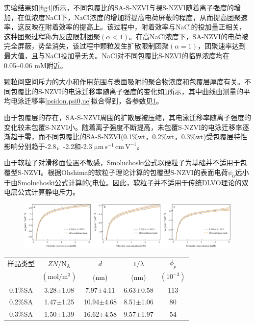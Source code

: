实验结果如\cref{fig4}所示，不同包覆比的SA-S-NZVI与裸S-NZVI随着离子强度的增加，在低浓度NaCl下，NaCl浓度的增加将提高电荷屏蔽的程度，从而提高团聚速率，这反映在附着效率的提高上。该过程中，附着效率与NaCl的投加量正相关，这种团聚过程称为反应限制团聚$(\alpha<1)$。在高NaCl浓度下，SA-NZVI的电荷被完全屏蔽，势垒消失，该过程中颗粒发生扩散限制团聚$(\alpha=1)$，团聚速率达到最大值，且与NaCl投加量无关。NaCl对不同包覆比S-NZVI的临界浓度均在0.05\textasciitilde0.06 mM附近。


颗粒间空间斥力的大小和作用范围与表面吸附的聚合物浓度和包覆层厚度有关。不同包覆比的S-NZVI的电泳迁移率随离子强度的变化如\cref{fig5}所示，其中曲线由测量的平均电泳迁移率\cref{psidon,psi0,ue}拟合得到，各参数见\cref{tb1}。

由于包覆层的存在，SA-S-NZVI周围的扩散层被压缩，其电泳迁移率随离子强度的变化较未包覆S-NZVI小。随着离子强度不断提高，未包覆S-NZVI的电泳迁移率逐渐趋于零，而不同包覆比的SA-S-NZVI(0.1\%wt，0.2\%wt，0.3\%wt)受包覆层特性影响分别趋于-2.8，-2.2和-2.3 $\mathrm{\mu m\, s^{-1}\, cm\,V^{-1}} $。

由于软粒子对滑移面位置不敏感\cite{1992Electrophoretic}，Smoluchoski公式以硬粒子为基础并不适用于包覆型S-NZVI。根据Ohshima的软粒子理论计算的包覆型S-NZVI的表面电荷$\psi_0$远小于由Smoluchoski公式计算的$\zeta$电位。因此，软粒子并不适用于传统DLVO理论的双电层公式计算静电斥力。

\begin{figure}[h]
    \centering
    \includegraphics[width=12cm]{figs/fig5.pdf}
    \label{fig5}
\end{figure}

\begin{table}
    \centering
    \label{tb1}
    \begin{tabular}{@{}ccccc@{}}
        \toprule
         样品类型 & $ZN$/$\mathrm{N_A}$& $d$ & $1/\lambda$ &$\phi_p$\\
           &$(\mathrm{mol/m^3})$&(nm)&(nm)& $(10^{-3})$ \\
        \midrule
        0.1\%SA & 3.28$\pm$1.08 & 7.97$\pm$4.11 & 6.63$\pm$0.58 & 113\\
        0.2\%SA & 1.47$\pm$1.25 & 10.94$\pm$4.68 & 8.51$\pm$1.06 & 80\\
        0.3\%SA & 1.50$\pm$1.39 & 16.62$\pm$4.58 & 9.57$\pm$1.97 & 54\\
        \bottomrule
    \end{tabular}
\end{table}


